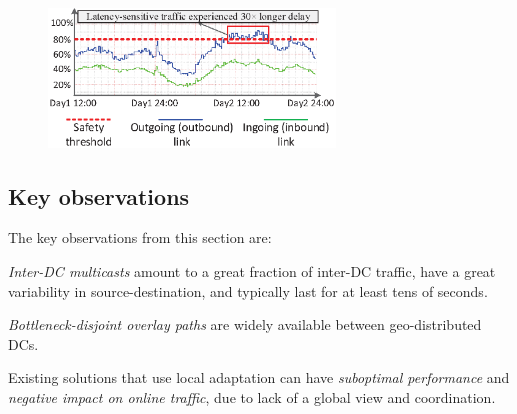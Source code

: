 

\begin{figure}[t!]
        \center
        \includegraphics[width=3in]{images/nj02-M2A_0212-0216_v2.eps}
        \label{fig:lesson2}
\vspace{-0.1in}
\end{figure}

\subsection{Key observations}
The key observations from this section are:
\begin{packeditemize}
\item {\em Inter-DC multicasts} amount to a
great fraction of inter-DC traffic,
have a great variability in source-destination, and typically last for at
least tens of seconds.
\item {\em Bottleneck-disjoint overlay paths} are widely available
between geo-distributed DCs.
\item Existing solutions that use local adaptation
can have {\em suboptimal performance} and {\em negative impact on
online traffic}, due to lack of a global view and coordination.
\end{packeditemize}




